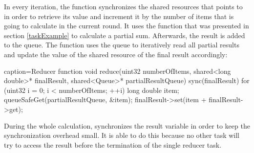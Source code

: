 In every iteration, the function synchronizes the shared resources that  points to in order to retrieve its value and increment it by the number of items that  is going to calculate in the current round. It uses the  function that was presented in section \ref{taskExample} to calculate a partial sum. Afterwards, the result is added to the queue. 
The  function uses the queue to iteratively read all partial results and update the value of the shared resource of the final result accordingly:
\begin{ccode}{caption=Reducer function}
void reduce(uint32 numberOfItems, shared<long double>* finalResult, shared<Queue>* partialResultQueue) {
  sync(finalResult) { 
    for (uint32 i = 0; i < numberOfItems; ++i) { 
      long double item; 
      queueSafeGet(partialResultQueue, &item); 
      finalResult->set(item + finalResult->get); 
    }
  }
}
\end{ccode}
During the whole calculation,  synchronizes the result variable in order to keep the synchronization overhead small. It is able to do this because no other task will try to access the result before the termination of the single reducer task.

